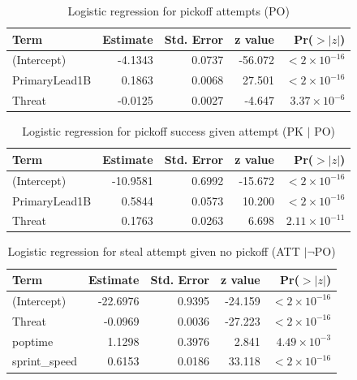 \documentclass[12pt,letterpaper]{article}
\begin{document}
\begin{table}[htbp]
\centering
\caption{Logistic regression for pickoff attempts (PO)}
\label{tab:po}
\begin{tabular}{lrrrr}
\toprule
Term & Estimate & Std. Error & z value & Pr($>|z|$) \\
\midrule
(Intercept)    & -4.1343 & 0.0737 & -56.072 & $< 2\times10^{-16}$ \\
PrimaryLead1B  &  0.1863 & 0.0068 &  27.501 & $< 2\times10^{-16}$ \\
Threat         & -0.0125 & 0.0027 &  -4.647 & $3.37\times10^{-6}$ \\
\bottomrule
\end{tabular}
\end{table}

\begin{table}[htbp]
\centering
\caption{Logistic regression for pickoff success given attempt (PK $\mid$ PO)}
\label{tab:pk_po}
\begin{tabular}{lrrrr}
\toprule
Term & Estimate & Std. Error & z value & Pr($>|z|$) \\
\midrule
(Intercept)    & -10.9581 & 0.6992 & -15.672 & $< 2\times10^{-16}$ \\
PrimaryLead1B  &   0.5844 & 0.0573 &  10.200 & $< 2\times10^{-16}$ \\
Threat         &   0.1763 & 0.0263 &   6.698 & $2.11\times10^{-11}$ \\
\bottomrule
\end{tabular}
\end{table}

\begin{table}[htbp]
\centering
\caption{Logistic regression for steal attempt given no pickoff (ATT $\mid \neg$PO)}
\label{tab:att_no_po}
\begin{tabular}{lrrrr}
\toprule
Term & Estimate & Std. Error & z value & Pr($>|z|$) \\
\midrule
(Intercept)   & -22.6976 & 0.9395 & -24.159 & $< 2\times10^{-16}$ \\
Threat        &  -0.0969 & 0.0036 & -27.223 & $< 2\times10^{-16}$ \\
poptime       &   1.1298 & 0.3976 &   2.841 & $4.49\times10^{-3}$ \\
sprint\_speed &   0.6153 & 0.0186 &  33.118 & $< 2\times10^{-16}$ \\
\bottomrule
\end{tabular}
\end{table}
\end{document}
